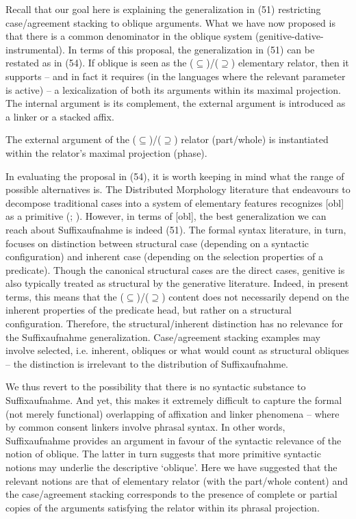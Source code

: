 \documentclass[output=paper]{langsci/langscibook}
\begin{document}
Recall that our goal here is explaining the generalization in (51) restricting case/agreement stacking to oblique arguments. What we have now proposed is that there is a common denominator in the oblique system (genitive-dative-instrumental). In terms of this proposal, the generalization in (51) can be restated as in (54). If oblique is seen as the ($\subseteq$)/($\supseteq$) elementary relator, then it supports – and in fact it requires (in the languages where the relevant parameter is active) – a lexicalization of both its arguments within its maximal projection. The internal argument is its complement, the external argument is introduced as a linker or a stacked affix.

\ea%
    \label{ex:manzini:54}
    The external argument of the ($\subseteq$)/($\supseteq$) relator (part/whole) is instantiated within the relator’s maximal projection (phase).
\z

In evaluating the proposal in (54), it is worth keeping in mind what the range of possible alternatives is. The Distributed Morphology literature that endeavours to decompose traditional cases into a system of elementary features recognizes [obl] as a primitive (\citealt{Halle1998}; \citealt{Calabrese2008}). However, in terms of [obl], the best generalization we can reach about Suffixaufnahme is indeed (51). The formal syntax literature, in turn, focuses on  distinction between structural case (depending on a syntactic configuration) and inherent case (depending on the selection properties of a predicate). Though the canonical structural cases are the direct cases, genitive is also typically treated as structural by the generative literature. Indeed, in present terms, this means that the ($\subseteq$)/($\supseteq$) content does not necessarily depend on the inherent properties of the predicate head, but rather on a structural configuration. Therefore, the structural/inherent distinction has no relevance for the Suffixaufnahme generalization. Case/agreement stacking examples may involve selected, i.e. inherent, obliques or what would count as structural obliques  – the distinction is irrelevant to the distribution of Suffixaufnahme. 

We thus revert to the possibility that there is no syntactic substance to Suffixaufnahme. And yet, this makes it extremely difficult to capture the formal (not merely functional) overlapping of affixation and linker phenomena – where by common consent linkers involve phrasal syntax. In other words, Suffixaufnahme provides an argument in favour of the syntactic relevance of the notion of oblique. The latter in turn suggests that more primitive syntactic notions may underlie the descriptive ‘oblique’. Here we have suggested that the relevant notions are that of elementary relator (with the part/whole content) and the case/agreement stacking corresponds to the presence of complete or partial copies of the arguments satisfying the relator within its phrasal projection. 
\end{document}
